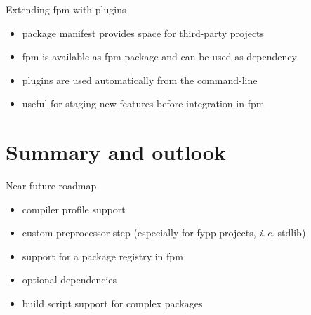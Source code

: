 \documentclass[lualatex,10pt,aspectratio=169]{beamer}
\begin{document}
\begin{frame}{Extending fpm with plugins}
   \begin{itemize}
      \item package manifest provides space for third-party projects
      \item fpm is available as fpm package and can be used as dependency
      \item plugins are used automatically from the command-line
      \item useful for staging new features before integration in fpm
   \end{itemize}
   \vfill

\end{frame}


\section{Summary and outlook}

\begin{frame}{Near-future roadmap}
   \begin{itemize}
      \item compiler profile support
      \item custom preprocessor step (especially for fypp projects, \textit{i.\,e.} stdlib)
      \item support for a package registry in fpm
      \item optional dependencies
      \item build script support for complex packages
   \end{itemize}
\end{frame}
\end{document}
